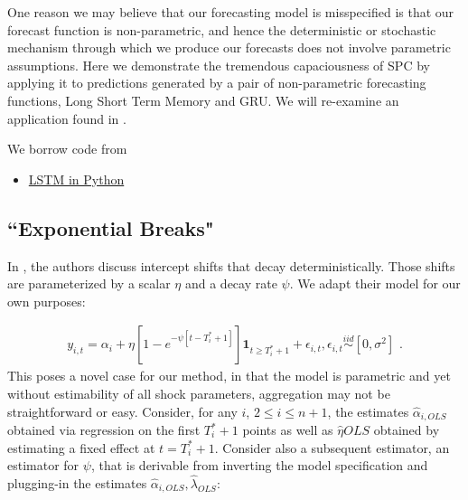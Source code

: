 \documentclass[11pt]{article}
\newcommand{\simiid}{\stackrel{iid}{\sim}} %
\theoremstyle{definition}
\begin{document}
One reason we may believe that our forecasting model is misspecified is that our forecast function is non-parametric, and hence the deterministic or stochastic mechanism through which we produce our forecasts does not involve parametric assumptions.  Here we demonstrate the tremendous capaciousness of SPC by applying it to predictions generated by a pair of non-parametric forecasting functions, Long Short Term Memory and GRU.  We will re-examine an application found in \cite{lin2021minimizing}.

We borrow code from \cite{Brownlee_2022}

\begin{itemize}
  \item \href{https://machinelearningmastery.com/time-series-prediction-lstm-recurrent-neural-networks-python-keras/}{LSTM in Python}
\end{itemize}

\subsection{``Exponential Breaks"}
In \cite{castle2011forecasting}, the authors discuss intercept shifts that decay deterministically.  Those shifts are parameterized by a scalar $\eta$ and a decay rate $\psi$.  We adapt their model for our own purposes:

\begin{align}
y_{i,t} = \alpha_{i} + \eta[1 - e^{-\psi[t-T_{i}^{*}+1]}]\textbf{1}_{t\geq T_{i}^{*}+1} + \epsilon_{i,t}, \epsilon_{i,t} \simiid [0,\sigma^{2}] \text{ .}\label{decay_model}
\end{align}
This poses a novel case for our method, in that the model is parametric and yet without estimability of all shock parameters, aggregation may not be straightforward or easy.  Consider, for any $i$, $2 \leq i \leq n+1$, the estimates $\hat\alpha_{i,OLS}$  obtained via regression on the first $T_{i}^{*}+1$ points as well as $\hat\eta{OLS}$ obtained by estimating a fixed effect at $t=T_{i}^{*}+1$.  Consider also a subsequent estimator, an estimator for $\psi$, that is derivable from inverting the model specification and plugging-in the estimates  $\hat\alpha_{i,OLS},\hat\lambda_{OLS}$:
\end{document}
